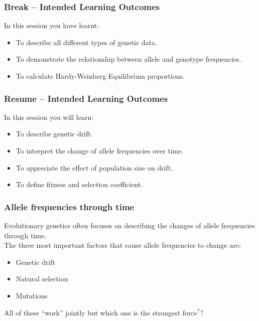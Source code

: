 \documentclass{beamer}
\newcommand{\1}{\ensuremath{\mathbf{1}}}
\begin{document}
%
%
%
\begin{frame}\frametitle{Break -- Intended Learning Outcomes}
	In this session you have learnt:
	\begin{itemize}
		\item To describe all different types of genetic data.
		\item To demonstrate the relationship between allele and genotype frequencies.
		\item To calculate Hardy-Weinberg Equilibrium proportions.
	\end{itemize}
\end{frame}
%
%
%
\begin{frame}\frametitle{Resume -- Intended Learning Outcomes}
	In this session you will learn:
	\begin{itemize}
		\item To describe genetic drift.
		\item To interpret the change of allele frequencies over time.
		\item To appreciate the effect of population size on drift.
		\item To define fitness and selection coefficient.
	\end{itemize}
\end{frame}
%
%
%
\begin{frame}\frametitle{Allele frequencies through time}
	Evolutionary genetics often focuses on describing the changes of allele frequencies through time.\\[2ex]
	The three most important factors that cause allele frequencies to change are:
	\begin{itemize}
		\item Genetic drift
		\item Natural selection
		\item Mutations
	\end{itemize}
	All of these ``work'' jointly but which one is the strongest force$^*$?\\
\end{frame}
\end{document}
